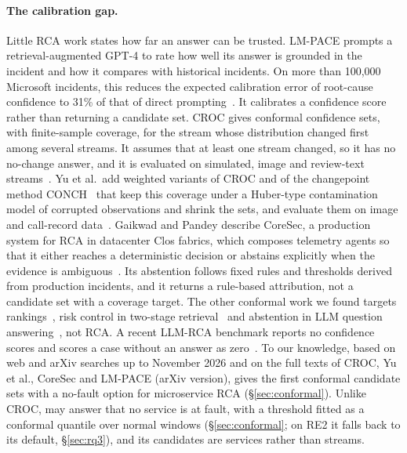 \paragraph{The calibration gap.}
Little RCA work states how far an answer can be trusted.
LM-PACE prompts a retrieval-augmented GPT-4 to rate how well its answer is grounded in the incident and how it compares with historical incidents. On more than 100,000 Microsoft incidents, this reduces the expected calibration error of root-cause confidence to 31\% of that of direct prompting~\cite{lmpace2024}. It calibrates a confidence score rather than returning a candidate set.
CROC gives conformal confidence sets, with finite-sample coverage, for the stream whose distribution changed first among several streams. It assumes that at least one stream changed, so it has no no-change answer, and it is evaluated on simulated, image and review-text streams~\cite{croc2026}.
Yu et al.\ add weighted variants of CROC and of the changepoint method CONCH~\cite{conchloc2026} that keep this coverage under a Huber-type contamination model of corrupted observations and shrink the sets, and evaluate them on image and call-record data~\cite{conch2026}.
Gaikwad and Pandey describe CoreSec, a production system for RCA in datacenter Clos fabrics, which composes telemetry agents so that it either reaches a deterministic decision or abstains explicitly when the evidence is ambiguous~\cite{abstention2026osdi}.
Its abstention follows fixed rules and thresholds derived from production incidents, and it returns a rule-based attribution, not a candidate set with a coverage target.
The other conformal work we found targets rankings~\cite{conformalranking2025}, risk control in two-stage retrieval~\cite{conformalretrieval2024} and abstention in LLM question answering~\cite{conformalabstention2024}, not RCA. A recent LLM-RCA benchmark reports no confidence scores and scores a case without an answer as zero~\cite{rcatlas2026}.
To our knowledge, based on web and arXiv searches up to November 2026 and on the full texts of CROC, Yu et al., CoreSec and LM-PACE (arXiv version), \sys gives the first conformal candidate sets with a no-fault option for microservice RCA (\S\ref{sec:conformal}).
Unlike CROC, \sys may answer that no service is at fault, with a threshold fitted as a conformal quantile over normal windows (\S\ref{sec:conformal}; on RE2 it falls back to its default, \S\ref{sec:rq3}), and its candidates are services rather than streams.

